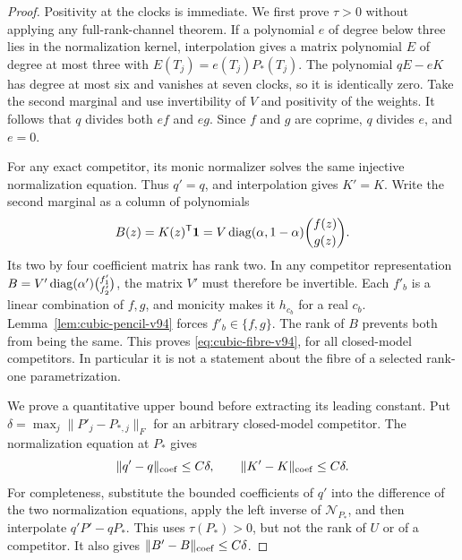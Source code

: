 \begin{proof}
Positivity at the clocks is immediate. We first prove $\tau>0$
without applying any full-rank-channel theorem. If a polynomial $e$
of degree below three lies in the normalization kernel, interpolation
gives a matrix polynomial $E$ of degree at most three with
$E(T_j)=e(T_j)P_*(T_j)$. The polynomial $qE-eK$ has degree at most
six and vanishes at seven clocks, so it is identically zero.
Take the second marginal and use invertibility of $V$ and positivity
of the weights. It follows that $q$ divides both $ef$ and $eg$.
Since $f$ and $g$ are coprime, $q$ divides $e$, and $e=0$.

For any exact competitor, its monic normalizer solves the same
injective normalization equation. Thus $q'=q$, and interpolation
gives $K'=K$. Write the second marginal as a column of polynomials
\[
 B(z)=K(z)^{\mathsf T}\mathbf 1
       =V\operatorname{diag}(\alpha,1-\alpha)\binom{f(z)}{g(z)}.
\]
Its two by four coefficient matrix has rank two. In any competitor
representation $B=V'\operatorname{diag}(\alpha')\binom{f'_1}{f'_2}$, the matrix
$V'$ must therefore be invertible. Each $f'_b$ is a linear combination
of $f,g$, and monicity makes it $h_{c_b}$ for a real $c_b$.
Lemma~\ref{lem:cubic-pencil-v94} forces $f'_b\in\{f,g\}$.
The rank of $B$ prevents both from being the same. This proves
\eqref{eq:cubic-fibre-v94}, for all closed-model competitors.
In particular it is not a statement about the fibre of a selected
rank-one parametrization.

We prove a quantitative upper bound before extracting its leading
constant. Put $\delta=\max_j\|P'_j-P_{*,j}\|_F$ for an arbitrary
closed-model competitor. The normalization equation at $P_*$ gives
\[
 \|q'-q\|_{\rm coef}\le C\delta,
 \qquad \|K'-K\|_{\rm coef}\le C\delta.
\]
For completeness, substitute the bounded coefficients of $q'$ into
the difference of the two normalization equations, apply the left
inverse of $\mathcal N_{P_*}$, and then interpolate $q'P'-qP_*$.
This uses $\tau(P_*)>0$, but not the rank of $U$ or of a competitor.
It also gives $\|B'-B\|_{\rm coef}\le C\delta$.


\end{proof}

